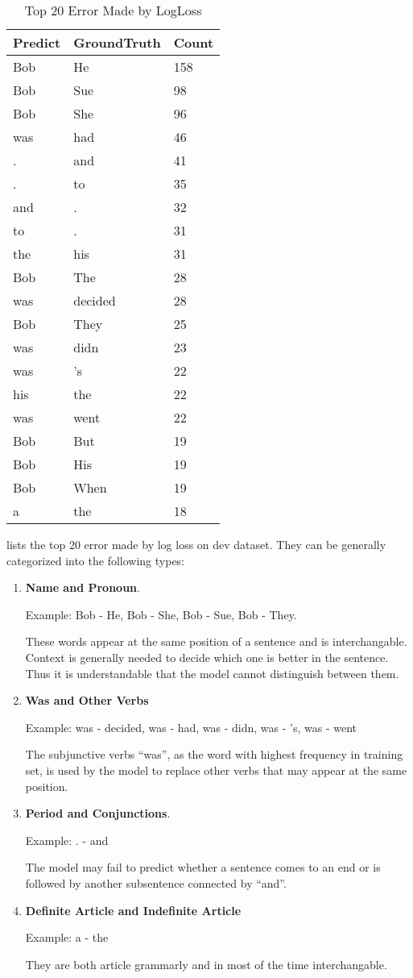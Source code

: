 \documentclass{article}
\begin{document}
\begin{table}
\centering
\begin{tabular}{l|l|l}
\textbf{Predict} & \textbf{GroundTruth} & \textbf{Count}\\
\hline
Bob&He&158\\
\hline
Bob&Sue&98\\
\hline
Bob&She&96\\
\hline
was&had&46\\
\hline
.&and&41\\
\hline
.&to&35\\
\hline
and&.&32\\
\hline
to&.&31\\
\hline
the&his&31\\
\hline
Bob&The&28\\
\hline
was&decided&28\\
\hline
Bob&They&25\\
\hline
was&didn&23\\
\hline
was&'s&22\\
\hline
his&the&22\\
\hline
was&went&22\\
\hline
Bob&But&19\\
\hline
Bob&His&19\\
\hline
Bob&When&19\\
\hline
a&the&18 \\
\end{tabular}
\caption{Top 20 Error Made by LogLoss}
\label{tab:logloss_top20}
\end{table}

 lists the top 20 error made by log loss on dev dataset. They can be generally categorized into the following types:
\begin{enumerate}
	\item \textbf{Name and Pronoun}. 

Example: Bob - He, Bob - She, Bob - Sue, Bob - They. 

These words appear at the same position of a sentence and is interchangable. Context is generally needed to decide which one is better in the sentence. Thus it is understandable that the model cannot distinguish between them.
	\item \textbf{Was and Other Verbs}

Example: was - decided, was - had, was - didn, was - 's, was - went

The subjunctive verbs ``was'', as the word with highest frequency in training set, is used by the model to replace other verbs that may appear at the same position.
	\item \textbf{Period and Conjunctions}.

Example: . - and 

The model may fail to predict whether a sentence comes to an end or is followed by another subsentence connected by ``and''.

	\item \textbf{Definite Article and Indefinite Article} 

Example: a - the

They are both article grammarly and in most of the time interchangable. 
\end{enumerate}
\end{document}
